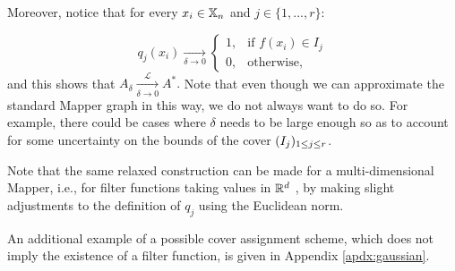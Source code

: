 Moreover, notice that for every $x_i\in\mathbb{X}_n$ and $j\in\{1,...,r\}$:

$$
    q_j(x_i)\xrightarrow[\delta \to 0]{}\begin{cases}
    1,& \text{if } f(x_i)\in I_j\\
    0,              & \text{otherwise,}
\end{cases}
$$
and this shows that $A_\delta\xrightarrow[\delta \to 0]{\mathcal{L}}A^\ast.$ Note that even though we can approximate the standard Mapper graph in this way, we do not always want to do so. For example, there could be cases where $\delta$ needs to be large enough so as to account for some uncertainty on the bounds of the cover $(I_j)_{1\leq j\leq r}$. 


\begin{remark}
Note that the same relaxed construction can be made for a multi-dimensional Mapper, i.e., for filter functions taking values in $\mathbb{R}^d$ \cite{carriere2022statistical}, by making slight adjustments to the definition of $q_j$ %
using the Euclidean norm.
\end{remark}
 


An additional example of a possible cover assignment scheme, which does not imply the existence of a filter function, is given in Appendix \ref{apdx:gaussian}.

